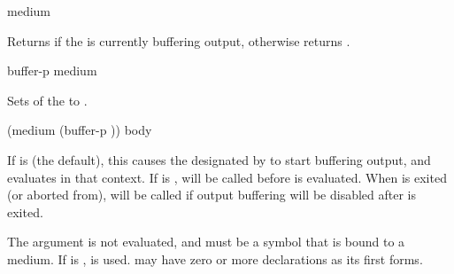  {medium}

Returns  if the   is currently buffering
output, otherwise returns .

 {buffer-p medium}

Sets  of the   to
.

 {(medium \optional (buffer-p ))
                                  \body body}

If  is  (the default), this causes the 
designated by  to start buffering output, and evaluates 
in that context.  If  is ,  will be
called before  is evaluated.  When  is exited (or aborted
from),  will be called if output buffering will be disabled
after  is exited.

The  argument is not evaluated, and must be a symbol that is bound
to a medium.  If  is ,  is used.
 may have zero or more declarations as its first forms.

